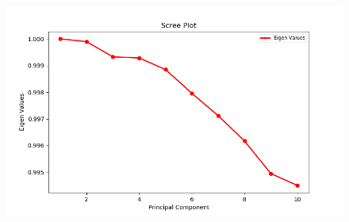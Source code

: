 \documentclass[12pt]{scrartcl}
\begin{document}
\begin{figure}[h]
    		
    		\includegraphics[scale=0.5]{1_10_S.png}
    		
\end{figure}
\newpage
\end{document}
